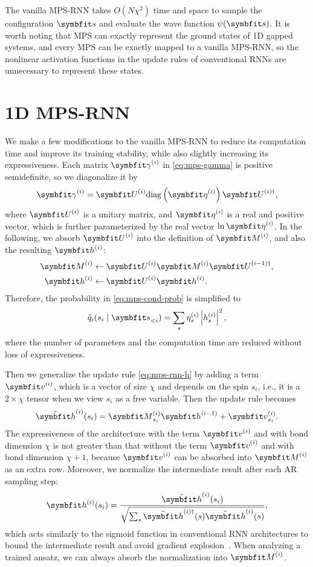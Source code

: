 The vanilla MPS-RNN takes $O(N \chi^2)$ time and space to sample the configuration $\vs$ and evaluate the wave function $\psi(\vs)$. It is worth noting that MPS can exactly represent the ground states of 1D gapped systems, and every MPS can be exactly mapped to a vanilla MPS-RNN, so the nonlinear activation functions in the update rules of conventional RNNs are unnecessary to represent these states.

\section{1D MPS-RNN}

We make a few modifications to the vanilla MPS-RNN to reduce its computation time and improve its training stability, while also slightly increasing its expressiveness. Each matrix $\mga^{(i)}$ in \cref{eq:mps-gamma} is positive semidefinite, so we diagonalize it by
\begin{equation}
\mga^{(i)} = \mU^{(i)} \diag\left( \vet^{(i)} \right) \mU^{(i) \dagger},
\end{equation}
where $\mU^{(i)}$ is a unitary matrix, and $\vet^{(i)}$ is a real and positive vector, which is further parameterized by the real vector $\ln \vet^{(i)}$. In the following, we absorb $\mU^{(i)}$ into the definition of $\mM^{(i)}$, and also the resulting $\vh^{(i)}$:
\begin{align}
\mM^{(i)} &\gets \mU^{(i)} \mM^{(i)} \mU^{(i - 1) \dagger}, \\
\vh^{(i)} &\gets \mU^{(i)} \vh^{(i)}.
\end{align}
Therefore, the probability in \cref{eq:mps-cond-prob} is simplified to
\begin{equation}
\tilde{q}_i(s_i \mid \vs_{< i}) = \sum_s \eta^{(i)}_s \left| h^{(i)}_s \right|^2,
\label{eq:mps-rnn-p-eta}
\end{equation}
where the number of parameters and the computation time are reduced without loss of expressiveness.

Then we generalize the update rule \cref{eq:mps-rnn-h} by adding a term $\vv^{(i)}$, which is a vector of size $\chi$ and depends on the spin $s_i$, i.e., it is a $2 \times \chi$ tensor when we view $s_i$ as a free variable. Then the update rule becomes
\begin{equation}
\tilde{\vh}^{(i)}(s_i) = \mM^{(i)}_{s_i} \vh^{(i - 1)} + \vv^{(i)}_{s_i}.
\label{eq:mps-rnn-h-v}
\end{equation}
The expressiveness of the architecture with the term $\vv^{(i)}$ and with bond dimension $\chi$ is not greater than that without the term $\vv^{(i)}$ and with bond dimension $\chi + 1$, because $\vv^{(i)}$ can be absorbed into $\mM^{(i)}$ as an extra row. Moreover, we normalize the intermediate result after each AR sampling step:
\begin{equation}
\vh^{(i)}(s_i) = \frac
{\tilde{\vh}^{(i)}(s_i)}
{\sqrt{\sum_s \tilde{\vh}^{(i) \dagger}(s) \tilde{\vh}^{(i)}(s)}},
\end{equation}
which acts similarly to the sigmoid function in conventional RNN architectures to bound the intermediate result and avoid gradient explosion~\cite{pascanu2013difficulty}. When analyzing a trained ansatz, we can always absorb the normalization into $\mM^{(i)}$.

